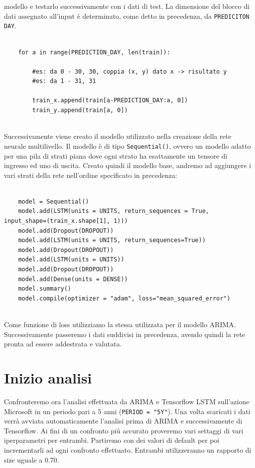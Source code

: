 \documentclass[a4paper,12pt]{article}
\begin{document}
        modello e testarlo successivamente con i dati di test. La 
        dimensione del blocco di dati assegnato all'input è determinato, 
        come detto in precedenza, da \lstinline|PREDICITON DAY|.
\begin{lstlisting}[frame = single]

    for a in range(PREDICTION_DAY, len(train)):

        #es: da 0 - 30, 30, coppia (x, y) dato x -> risultato y
        #es: da 1 - 31, 31

        train_x.append(train[a-PREDICTION_DAY:a, 0])
        train_y.append(train[a, 0])
    
\end{lstlisting}
        Successivamente viene creato il modello utilizzato nella creazione
        della rete neurale multilivello. Il modello è di tipo 
        \lstinline|Sequential()|, ovvero un modello adatto per una pila di 
        strati piana dove ogni strato ha esattamente un tensore di ingresso
        ed uno di uscita.
        Creato quindi il modello base, andremo ad aggiungere i vari strati
        della rete nell'ordine specificato in precedenza:
\begin{lstlisting}[frame = single]

    model = Sequential()
    model.add(LSTM(units = UNITS, return_sequences = True, input_shape=(train_x.shape[1], 1)))
    model.add(Dropout(DROPOUT))
    model.add(LSTM(units = UNITS, return_sequences=True))
    model.add(Dropout(DROPOUT))
    model.add(LSTM(units = UNITS))
    model.add(Dropout(DROPOUT))
    model.add(Dense(units = DENSE))
    model.summary()
    model.compile(optimizer = "adam", loss="mean_squared_error")
    
\end{lstlisting}
        Come funzione di loss utilizziamo la stessa utilizzata per il 
        modello ARIMA. Successivamente passeremo i dati suddivisi in
        precedenza, avendo quindi la rete pronta ad essere addestrata e 
        valutata.

    \section{Inizio analisi} Confronteremo ora l'analisi effettuata da ARIMA e 
    Tensorflow LSTM sull'azione Microsoft in un periodo pari a 5 anni
    (\lstinline|PERIOD = "5Y"|). Una volta scaricati i dati verrà avviata 
    automaticamente l'analisi prima di ARIMA e successivamente di Tensorflow.
    Ai fini di un confronto più accurato proveremo vari settaggi di vari 
    iperparametri per entrambi. Partiremo con dei valori di default per poi 
    incrementarli ad ogni confronto effettuato. Entrambi utilizzeranno un 
    rapporto di size uguale a 0.70.
\end{document}
